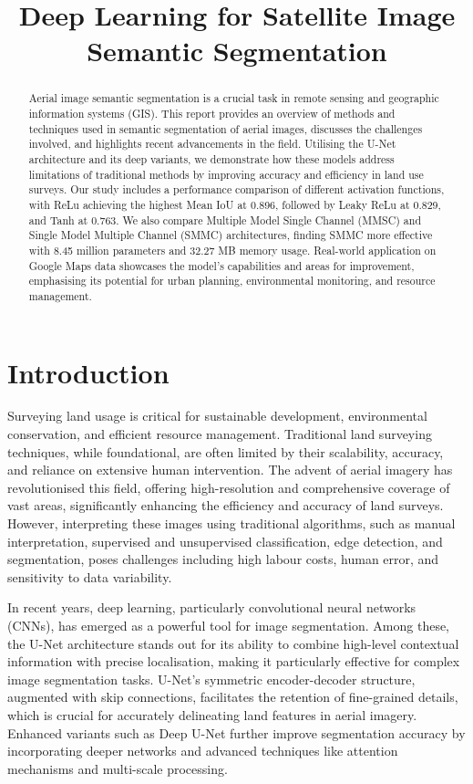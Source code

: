 \documentclass[conference]{IEEEtran}
\title{Deep Learning for Satellite Image Semantic Segmentation}
\author{
    \IEEEauthorblockN{Chinatip Lawansuk}
    \IEEEauthorblockA{
        Department of Electrical Engineering and Computer Science\\
        National Taipei University of Technology\\
        Email: t112998405@ntut.edu.tw
    }
}
\begin{document}
\maketitle

\begin{abstract}
Aerial image semantic segmentation is a crucial task in remote sensing and geographic information systems (GIS). This report provides an overview of methods and techniques used in semantic segmentation of aerial images, discusses the challenges involved, and highlights recent advancements in the field. Utilising the U-Net architecture and its deep variants, we demonstrate how these models address limitations of traditional methods by improving accuracy and efficiency in land use surveys. Our study includes a performance comparison of different activation functions, with ReLu achieving the highest Mean IoU at 0.896, followed by Leaky ReLu at 0.829, and Tanh at 0.763. We also compare Multiple Model Single Channel (MMSC) and Single Model Multiple Channel (SMMC) architectures, finding SMMC more effective with 8.45 million parameters and 32.27 MB memory usage. Real-world application on Google Maps data showcases the model’s capabilities and areas for improvement, emphasising its potential for urban planning, environmental monitoring, and resource management.
\end{abstract}

\section{Introduction}
Surveying land usage is critical for sustainable development, environmental conservation, and efficient resource management. Traditional land surveying techniques, while foundational, are often limited by their scalability, accuracy, and reliance on extensive human intervention. The advent of aerial imagery has revolutionised this field, offering high-resolution and comprehensive coverage of vast areas, significantly enhancing the efficiency and accuracy of land surveys. However, interpreting these images using traditional algorithms, such as manual interpretation, supervised and unsupervised classification, edge detection, and segmentation, poses challenges including high labour costs, human error, and sensitivity to data variability.

In recent years, deep learning, particularly convolutional neural networks (CNNs), has emerged as a powerful tool for image segmentation. Among these, the U-Net architecture stands out for its ability to combine high-level contextual information with precise localisation, making it particularly effective for complex image segmentation tasks. U-Net's symmetric encoder-decoder structure, augmented with skip connections, facilitates the retention of fine-grained details, which is crucial for accurately delineating land features in aerial imagery. Enhanced variants such as Deep U-Net further improve segmentation accuracy by incorporating deeper networks and advanced techniques like attention mechanisms and multi-scale processing.
\end{document}
